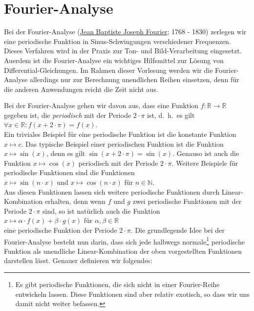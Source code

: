 \chapter{Fourier-Analyse}
Bei der Fourier-Analyse 
(\href{http://de.wikipedia.org/wiki/Joseph_Fourier}{Jean Baptiste Joseph Fourier}; 1768 - 1830) 
zerlegen wir eine 
periodische Funktion in Sinus-Schwingungen verschiedener Frequenzen.  Dieses Verfahren
wird in der Praxis zur Ton- und Bild-Verarbeitung eingesetzt.  Au\3erdem ist die
Fourier-Analyse ein wichtiges Hilfsmittel zur L\"osung von Differential-Gleichungen.
Im Rahmen dieser Vorlesung werden wir die Fourier-Analyse allerdings nur zur Berechnung
unendlichen Reihen einsetzen, denn f\"ur die anderen Anwendungen reicht die Zeit 
nicht aus.

Bei der Fourier-Analyse gehen wir davon aus, dass eine Funktion 
$f:\mathbb{R} \rightarrow \mathbb{R}$ gegeben ist, die \emph{periodisch} mit der
Periode $2\cdot\pi$ ist, d.~h.~es gilt
\\[0.1cm]
\hspace*{1.3cm}
$\forall x \in\mathbb{R}: f(x+2\cdot\pi) = f(x)$.
\\[0.1cm]
Ein triviales Beispiel f\"ur eine periodische Funktion ist die konstante Funktion 
$x \mapsto c$.
Das typische Beispiel einer periodischen Funktion ist die Funktion
$x \mapsto \sin(x)$, denn es gilt $\sin(x+2\cdot\pi) = \sin(x)$.  Genauso ist auch die
Funktion $x \mapsto \cos(x)$ periodisch mit der Periode $2\cdot\pi$. 
Weitere Beispiele f\"ur periodische Funktionen sind die Funktionen 
\\[0.1cm]
\hspace*{1.3cm}
$x \mapsto \sin(n\cdot x)$ \quad und \quad $x \mapsto \cos(n\cdot x)$ 
\quad f\"ur $n\in\mathbb{N}$.
\\[0.1cm]
Aus diesen Funktionen lassen sich weitere periodische Funktionen durch Linear-Kombination
erhalten, denn wenn $f$ und $g$ zwei periodische Funktionen mit der Periode $2\cdot\pi$
sind, so ist nat\"urlich auch die Funktion
\\[0.1cm]
\hspace*{1.3cm}
$x \mapsto \alpha \cdot f(x) + \beta \cdot g(x)$ \quad f\"ur $\alpha,\beta\in\mathbb{R}$
\\[0.1cm] 
eine periodische Funktion der Periode $2\cdot\pi$.  Die grundlegende Idee bei der
Fourier-Analyse besteht nun darin, dass sich jede halbwegs normale\footnote{
Es gibt periodische Funktionen, die sich nicht in einer Fourier-Reihe entwickeln
lassen.  Diese Funktionen sind aber relativ exotisch, so dass wir uns damit nicht weiter
befassen. 
}
periodische Funktion als unendliche Linear-Kombination der oben vorgestellten Funktionen
darstellen l\"asst.  Genauer definieren wir folgendes: 

